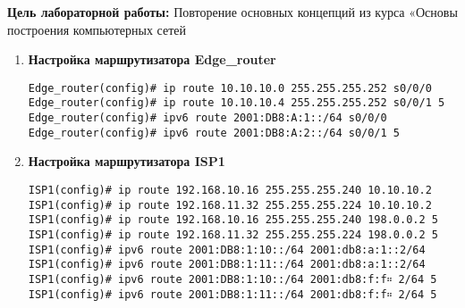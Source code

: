 \documentclass[a4paper,14pt]{extarticle}
\begin{document}
    \textbf{Цель лабораторной работы:}
    Повторение основных концепций из курса «Основы построения компьютерных сетей
    

    \begin{enumerate}
        \item \textbf{Настройка маршрутизатора Edge\_router}
        \begin{lstlisting}
Edge_router(config)# ip route 10.10.10.0 255.255.255.252 s0/0/0
Edge_router(config)# ip route 10.10.10.4 255.255.255.252 s0/0/1 5
Edge_router(config)# ipv6 route 2001:DB8:A:1::/64 s0/0/0
Edge_router(config)# ipv6 route 2001:DB8:A:2::/64 s0/0/1 5
        \end{lstlisting}
        \item \textbf{Настройка маршрутизатора ISP1}
        \begin{lstlisting}
ISP1(config)# ip route 192.168.10.16 255.255.255.240 10.10.10.2
ISP1(config)# ip route 192.168.11.32 255.255.255.224 10.10.10.2
ISP1(config)# ip route 192.168.10.16 255.255.255.240 198.0.0.2 5
ISP1(config)# ip route 192.168.11.32 255.255.255.224 198.0.0.2 5
ISP1(config)# ipv6 route 2001:DB8:1:10::/64 2001:db8:a:1::2/64
ISP1(config)# ipv6 route 2001:DB8:1:11::/64 2001:db8:a:1::2/64
ISP1(config)# ipv6 route 2001:DB8:1:10::/64 2001:db8:f:f። 2/64 5
ISP1(config)# ipv6 route 2001:DB8:1:11::/64 2001:db8:f:f። 2/64 5
        \end{lstlisting}
    \end{enumerate}
\end{document}
